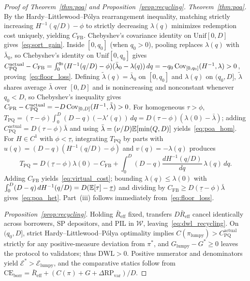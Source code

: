 \begin{proof}[Proof of Theorem~\ref{thm:poa} and Proposition~\ref{prop:recycling}]
\emph{Theorem~\ref{thm:poa}.} By the Hardy--Littlewood--P\'olya rearrangement inequality, matching strictly increasing $H^{-1}(q/D) - \phi$ to strictly decreasing $\lambda(q)$ minimizes redemption cost uniquely, yielding $C_{\mathrm{FB}}$. Chebyshev's covariance identity on $\mathrm{Unif}[0, D]$ gives~\eqref{eq:sort_gain}. Inside $[0, q_0]$ (when $q_0 > 0$), pooling replaces $\lambda(q)$ with $\bar{\lambda}_0$, so Chebyshev's identity on $\mathrm{Unif}[0, q_0]$ gives $C_{\mathrm{PQ}}^{\mathrm{actual}} - C_{\mathrm{FB}} = \int_0^{q_0}(H^{-1}(q/D) - \phi)(\bar{\lambda}_0 - \lambda(q))\,dq = -q_0\operatorname{Cov}_{[0, q_0]}(H^{-1}, \lambda) > 0$, proving~\eqref{eq:floor_loss}. Defining $\tilde{\lambda}(q) = \bar{\lambda}_0$ on $[0, q_0]$ and $\lambda(q)$ on $(q_0, D]$, $\tilde{\lambda}$ shares average $\bar{\lambda}$ over $[0, D]$ and is nonincreasing and nonconstant whenever $q_0 < D$, so Chebyshev's inequality gives $C_{\mathrm{PR}} - C_{\mathrm{PQ}}^{\mathrm{actual}} = -D\operatorname{Cov}_{[0, D]}(H^{-1}, \tilde{\lambda}) > 0$. For homogeneous $\tau > \phi$, $T_{\mathrm{PQ}} = (\tau - \phi)\int_0^D (D - q)(-\lambda'(q))\,dq = D(\tau - \phi)(\lambda(0) - \bar{\lambda})$; adding $C_{\mathrm{PQ}}^{\mathrm{actual}} = D(\tau - \phi)\bar{\lambda}$ and using $\bar{\lambda} = (\nu/D)\mathbb{E}[\min(Q, D)]$ yields~\eqref{eq:poa_hom}. For $H \in C^1$ with $\phi < \underline{\tau}$, integrating $T_{\mathrm{PQ}}$ by parts with $u(q) = (D - q)(H^{-1}(q/D) - \phi)$ and $v(q) = -\lambda(q)$ produces
\[
T_{\mathrm{PQ}} = D(\underline{\tau} - \phi)\lambda(0) - C_{\mathrm{FB}} + \int_0^D (D - q)\frac{dH^{-1}(q/D)}{dq}\,\lambda(q)\,dq.
\]
Adding $C_{\mathrm{FB}}$ yields~\eqref{eq:virtual_cost}; bounding $\lambda(q) \le \lambda(0)$ with $\int_0^D (D - q)\,dH^{-1}(q/D) = D(\mathbb{E}[\tau] - \underline{\tau})$ and dividing by $C_{\mathrm{FB}} \ge D(\underline{\tau} - \phi)\bar{\lambda}$ gives~\eqref{eq:poa_het}. Part~(iii) follows immediately from~\eqref{eq:floor_loss}.

\emph{Proposition~\ref{prop:recycling}.} Holding $\bar{R}_{\mathrm{eff}}$ fixed, transfers $D\bar{R}_{\mathrm{eff}}$ cancel identically across borrowers, SP depositors, and PIL in $\mathcal{W}$, leaving~\eqref{eq:dwl_recycling}. On $(q_0, D]$, strict Hardy--Littlewood--P\'olya optimality implies $C(\pi_{\mathrm{lumpy}}) > C_{\mathrm{PQ}}^{\mathrm{actual}}$ strictly for any positive-measure deviation from $\pi^*$, and $G_{\mathrm{lumpy}} - G^* \ge 0$ leaves the protocol to validators; thus $\mathrm{DWL} > 0$. Positive numerator and denominators yield $\mathcal{E}^* > \mathcal{E}_{\mathrm{lumpy}}$, and the comparative statics follow from $\mathrm{CE}_{\mathrm{borr}} = \bar{R}_{\mathrm{eff}} + (C(\pi) + G + \Delta\mathrm{RP}_{\mathrm{var}})/D$.
\end{proof}

